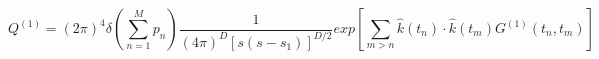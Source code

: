 \begin{equation}
Q^{(1)}=(2\pi)^4\delta\left(\sum\limits_{n=1}^Mp_n\right)\frac{1}{(4\pi)^D[s(s-s_1)]^{D/2}}
exp\left[\sum\limits_{m>n}\hat{k}(t_n)\cdot\hat{k}(t_m)
G^{(1)}(t_n,t_m)\right]
\end{equation}

